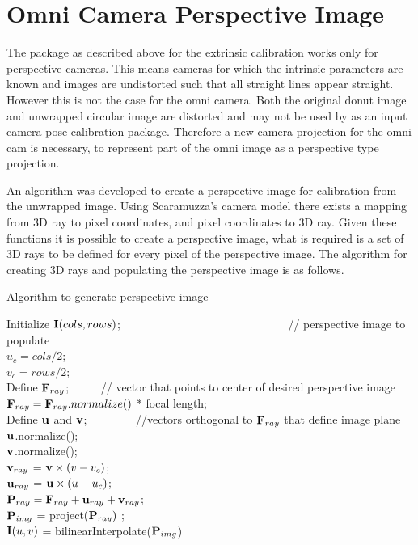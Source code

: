 \section{Omni Camera Perspective Image}
\label{sec:perspective_from_donut}

The package as described above for the extrinsic calibration works only for perspective cameras. This means cameras for which the intrinsic parameters are known and images are undistorted such that all straight lines appear straight.  However this is not the case for the omni camera.  Both the original donut image and unwrapped circular image are distorted and may not be used by as an input camera pose calibration package.  Therefore a new camera projection for the omni cam is necessary, to represent part of the omni image as a perspective type projection.

An algorithm was developed to create a perspective image for calibration from the unwrapped image.  Using Scaramuzza's camera model\cite{scaramuzza_06} there exists a  mapping from 3D ray to pixel coordinates, and pixel coordinates to 3D ray.  Given these functions it is possible to create a perspective image, what is required is a set of 3D rays to be defined for every pixel of the perspective image.  The algorithm for creating 3D rays and populating the perspective image is as follows.

\begin{algorithm}[h!]
 \caption{Algorithm to generate perspective image}
 Initialize $\mathbf I(cols,rows)$; \ \ \ \ \ \ \ \ \ \ \ \ \ \ \ \ \ \ \ \ \ \ \ \ \ \ \ \ \ 
 // perspective image to populate \\
 $u_c = cols/2$;  \\
 $v_c = rows/2$;  \\
 Define $\mathbf F_{ray}$; \ \ \ \ \ 
 // vector that points to center of desired perspective image \\
 $\mathbf F_{ray} = \mathbf F_{ray}.normalize()$ * focal length; \ \ \ \ \ \ \ \ \ \ \ \ \ \ \ \ \\
 Define $\mathbf u$ and $\mathbf v$; \ \ \ \ \ \ \ \ 
 //vectors orthogonal to $\mathbf F_{ray}$ that define image plane \\
 $\mathbf u$.normalize(); \\
 $\mathbf v$.normalize(); \\
 \For{v = 0 to rows}
 {
   $\mathbf v_{ray}$ = $\mathbf v \times (v - v_c)$; \\
   {
     $\mathbf u_{ray}$ = $\mathbf u \times (u - u_c)$; \\
     $\mathbf P_{ray} = \mathbf F_{ray} + \mathbf u_{ray} + \mathbf v_{ray}$; \\
     $\mathbf P_{img}$ = project($\mathbf P_{ray})$ ; \\
     $\mathbf I(u,v)$ = bilinearInterpolate($\mathbf P_{img}$)
   }
 }
\end{algorithm}

